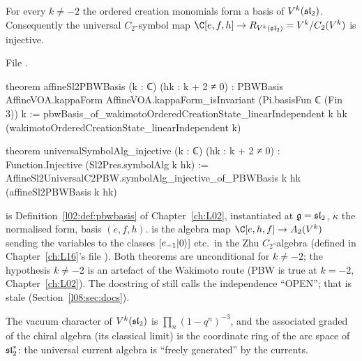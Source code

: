 \begin{theorem}\label{l08:thm:pbw}
For every $k\ne-2$ the ordered creation monomials form a basis of $V^k(\mathfrak{sl}_2)$. Consequently the
universal $C_2$-symbol map $\C[e,f,h]\to R_{V^k(\leightsl)} = V^k/C_2(V^k)$ is injective.
\end{theorem}

\noindent File .
\begin{leancode}
theorem affineSl2PBWBasis (k : ℂ) (hk : k + 2 ≠ 0) :
    PBWBasis AffineVOA.kappaForm AffineVOA.kappaForm_isInvariant
      (Pi.basisFun ℂ (Fin 3)) k :=
  pbwBasis_of_wakimotoOrderedCreationState_linearIndependent k hk
    (wakimotoOrderedCreationState_linearIndependent k)

theorem universalSymbolAlg_injective (k : ℂ) (hk : k + 2 ≠ 0) :
    Function.Injective (Sl2Pres.symbolAlg k hk) :=
  AffineSl2UniversalC2PBW.symbolAlg_injective_of_PBWBasis k hk
    (affineSl2PBWBasis k hk)
\end{leancode}

\begin{dictionary}
 is Definition~\ref{l02:def:pbwbasis} of Chapter~\ref{ch:L02}, instantiated at
$\mathfrak g=\mathfrak{sl}_2$, $\kappa$ the normalised form, basis $(e,f,h)$.  is the
algebra map $\C[e,h,f]\to A_2(V^k)$ sending the variables to the classes $[e_{-1}|0\rangle]$ etc.\ in the
Zhu $C_2$-algebra (defined in Chapter~\ref{ch:L16}'s file ). Both
theorems are unconditional for $k\ne-2$; the hypothesis $k\ne-2$ is an artefact of the Wakimoto route
(PBW is true at $k=-2$, Chapter~\ref{ch:L02}). The docstring of 
still calls the independence ``OPEN''; that is stale (Section~\ref{l08:sec:docs}).
\end{dictionary}

\begin{physics}
The vacuum character of $V^k(\mathfrak{sl}_2)$ is $\prod_n(1-q^n)^{-3}$, and the associated graded of the
chiral algebra (its classical limit) is the coordinate ring of the arc space of $\mathfrak{sl}_2^*$: the
universal current algebra is ``freely generated'' by the currents.
\end{physics}

